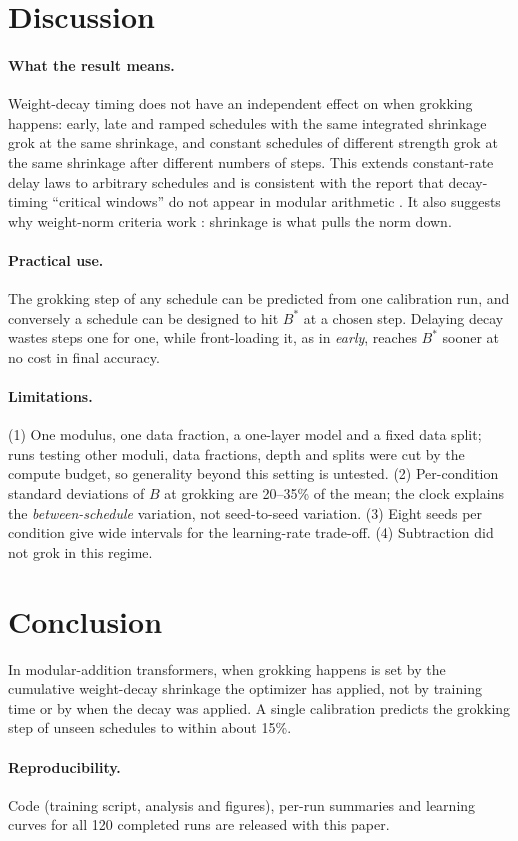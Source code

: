 \documentclass[11pt]{article}
\begin{document}
\section{Discussion}
\paragraph{What the result means.} Weight-decay timing does not have an independent effect on when grokking happens: early, late and ramped schedules with the same integrated shrinkage grok at the same shrinkage, and constant schedules of different strength grok at the same shrinkage after different numbers of steps. This extends constant-rate delay laws \citep{kim2026clock,truong2026normseparation} to arbitrary schedules and is consistent with the report that decay-timing ``critical windows'' do not appear in modular arithmetic \citep{ali2026critical}. It also suggests why weight-norm criteria work \citep{liu2023omnigrok,truong2026normsets}: shrinkage is what pulls the norm down.

\paragraph{Practical use.} The grokking step of any schedule can be predicted from one calibration run, and conversely a schedule can be designed to hit $B^\ast$ at a chosen step. Delaying decay wastes steps one for one, while front-loading it, as in \emph{early}, reaches $B^\ast$ sooner at no cost in final accuracy.

\paragraph{Limitations.} (1) One modulus, one data fraction, a one-layer model and a fixed data split; runs testing other moduli, data fractions, depth and splits were cut by the compute budget, so generality beyond this setting is untested. (2) Per-condition standard deviations of $B$ at grokking are 20--35\% of the mean; the clock explains the \emph{between-schedule} variation, not seed-to-seed variation. (3) Eight seeds per condition give wide intervals for the learning-rate trade-off. (4) Subtraction did not grok in this regime.

\section{Conclusion}
In modular-addition transformers, when grokking happens is set by the cumulative weight-decay shrinkage the optimizer has applied, not by training time or by when the decay was applied. A single calibration predicts the grokking step of unseen schedules to within about 15\%.

\paragraph{Reproducibility.} Code (training script, analysis and figures), per-run summaries and learning curves for all 120 completed runs are released with this paper.



\end{document}
